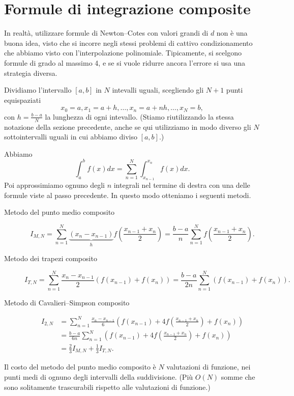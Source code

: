 \documentclass[a4paper]{report}
\theoremstyle{definiton}
\theoremstyle{remark}
\begin{document}
\section{Formule di integrazione composite}

In realtà, utilizzare formule di Newton--Cotes con valori grandi di $d$ non è una buona idea, visto che si incorre negli stessi problemi di cattivo condizionamento che abbiamo visto con l'interpolazione polinomiale. Tipicamente, si scelgono formule di grado al massimo 4, e se si vuole ridurre ancora l'errore si usa una strategia diversa.

Dividiamo l'intervallo $[a,b]$ in $N$ intevalli uguali, scegliendo gli $N+1$ punti equispaziati
\[
x_0=a, x_1=a+h, \dots,x_n = a+nh,\dots, x_N=b,
\]
con $h= \frac{b-a}{N}$ la lunghezza di ogni intevallo. (Stiamo riutilizzando la stessa notazione della sezione precedente, anche se qui utilizziamo in modo diverso gli $N$ sottointervalli uguali in cui abbiamo diviso $[a,b]$.)

Abbiamo
\[
\int_a^b f(x) dx = \sum_{n=1}^N \int_{x_{n-1}}^{x_n} f(x) dx.
\]
Poi approssimiamo ognuno degli $n$ integrali nel termine di destra con una delle formule viste al passo precedente. In questo modo otteniamo i seguenti metodi.

\begin{description}
    \item[Metodo del punto medio composito]
\[
I_{M,N} = \sum_{n=1}^N \underbrace{(x_{n}-x_{n-1})}_{h}f\left(\frac{x_{n-1}+x_n}{2}\right) = \frac{b-a}{n} \sum_{n=1}^N f\left(\frac{x_{n-1}+x_n}{2}\right).
\]
\item[Metodo dei trapezi composito]
\[
I_{T,N} = \sum_{n=1}^N \frac{x_{n}-x_{n-1}}2 \left(f(x_{n-1})+f(x_n)\right) = \frac{b-a}{2n} \sum_{n=1}^N\left(f(x_{n-1})+f(x_n)\right).
\]
\item[Metodo di Cavalieri--Simpson composito]
\begin{align*}
    I_{2,N} &= \sum_{n=1}^N  \frac{x_{n}-x_{n-1}}6  \left(f(x_{n-1})+4f\left(\frac{x_{n-1}+x_n}{2}\right) + f(x_n)\right)\\
    &= \frac{b-a}{6n} \sum_{n=1}^N \left(f(x_{n-1})+4f\left(\frac{x_{n-1}+x_n}{2}\right) + f(x_n)\right)\\
    &= \frac{2}{3}I_{M,N} + \frac13 I_{T,N}.
\end{align*}
\end{description}
Il costo del metodo del punto medio composito è $N$ valutazioni di funzione, nei punti medi di ognuno degli intervalli della suddivisione. (Più $O(N)$ somme che sono solitamente trascurabili rispetto alle valutazioni di funzione.)
\end{document}
